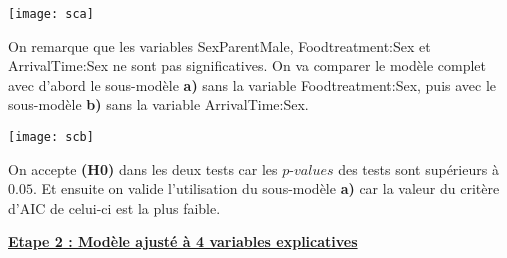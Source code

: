 \documentclass[12pt,fleqn]{book} %
\begin{document}
\vspace{2em}


\vspace{2em}

\texttt{[image: sca]}

\vspace{1em}

On remarque que les variables SexParentMale, Foodtreatment:Sex et ArrivalTime:Sex ne sont pas significatives. On va comparer le modèle complet avec d'abord le sous-modèle \textbf{a)} sans la variable Foodtreatment:Sex, puis avec le sous-modèle  \textbf{b)} sans la variable ArrivalTime:Sex. 

\vspace{2em}


\vspace{2em}

\texttt{[image: scb]}

\vspace{1em}

On accepte \textbf{(H0)} dans les deux tests car les $p$-$values$ des tests sont supérieurs à $0.05$. Et ensuite on valide l'utilisation du sous-modèle \textbf{a)} car la valeur du critère d'AIC de celui-ci est la plus faible.

\vspace{1em}

\underline{\textbf{Etape 2 : Modèle ajusté à 4 variables explicatives}}

\vspace{2em}
\end{document}
